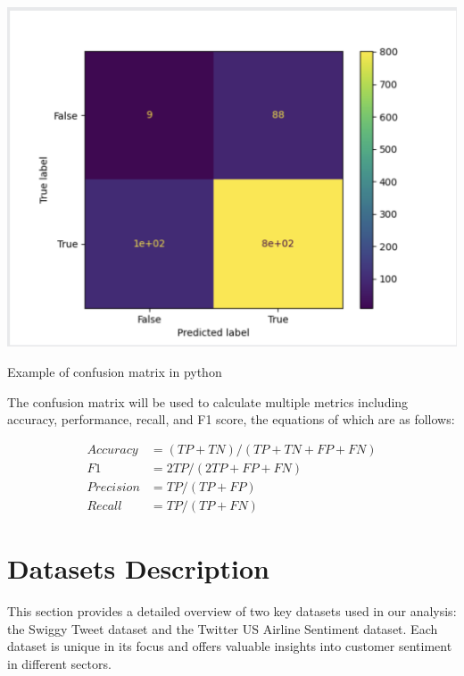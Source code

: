 \documentclass[conference]{IEEEtran}
\begin{document}
    \begin{centering}
    \includegraphics[width=0.5 \textwidth]{confusion_matrix.png}
    \caption{Example of confusion matrix in python}
    
The confusion matrix will be used to calculate multiple metrics including accuracy, performance, recall, and F1 score, the equations of which are as follows:
\end{centering}

\begin{align}
    Accuracy &= (TP + TN) / (TP + TN + FP + FN)\\
    F1 &= 2TP / (2TP + FP + FN)\\
    Precision &= TP / (TP + FP)\\
    Recall &= TP / (TP + FN)
\end{align}

\section{Datasets Description}
This section provides a detailed overview of two key datasets used in our analysis: the Swiggy Tweet dataset and the Twitter US Airline Sentiment dataset. Each dataset is unique in its focus and offers valuable insights into customer sentiment in different sectors.
\end{document}
